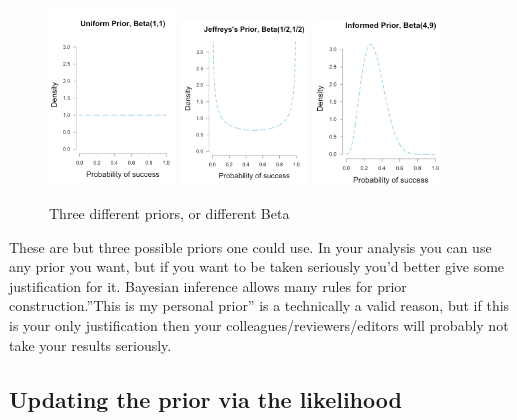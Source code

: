 \begin{figure}[h]
    \centering
\includegraphics[width=0.3\textwidth]{pic/p05c03-snip06-1.png}
\includegraphics[width=0.3\textwidth]{pic/p05c03-snip06-2.png}
\includegraphics[width=0.3\textwidth]{pic/p05c03-snip06-3.png}
    \caption{Three different priors, or different Beta}
    \label{fig:p05c03-snip06}
\end{figure}

These are but three possible priors one could use. In your analysis you can use any prior you want, but if you want to be taken seriously you'd better give some justification for it. Bayesian inference allows many rules for prior construction.''This is my personal prior'' is a technically a valid reason, but if this is your only justification then your colleagues/reviewers/editors will probably not take your results seriously.

\FloatBarrier

\subsection{Updating the prior via the likelihood}

